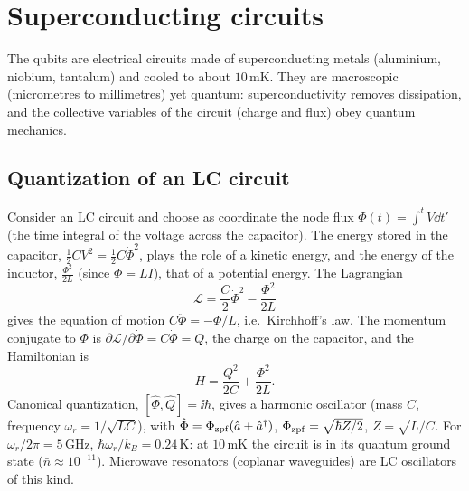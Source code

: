 \section{Superconducting circuits}\label{sec:transmon}
The qubits are electrical circuits made of superconducting metals (aluminium, niobium, tantalum) and cooled to about $10$\,mK. They are macroscopic (micrometres to millimetres) yet quantum: superconductivity removes dissipation, and the
collective variables of the circuit (charge and flux) obey quantum mechanics.

\subsection{Quantization of an LC circuit}\label{sec:lc}
\begin{origin}
Consider an LC circuit and choose as coordinate the node flux $\Phi(t)=\int^tV\dd t'$ (the time integral of the voltage across the capacitor). The energy stored in the capacitor, $\frac12CV^2=\frac12C\dot\Phi^2$, plays the role of a kinetic
energy, and the energy of the inductor, $\frac{\Phi^2}{2L}$ (since $\Phi=LI$), that of a potential energy. The Lagrangian
\begin{equation}
  \mathcal L=\frac C2\dot\Phi^2-\frac{\Phi^2}{2L}
\end{equation}
gives the equation of motion $C\ddot\Phi=-\Phi/L$, i.e.\ Kirchhoff's law. The momentum conjugate to $\Phi$ is $\partial\mathcal L/\partial\dot\Phi=C\dot\Phi=Q$, the charge on the capacitor, and the Hamiltonian is
\begin{equation}
  H=\frac{Q^2}{2C}+\frac{\Phi^2}{2L}.
\end{equation}
Canonical quantization, $[\hat\Phi,\hat Q]=\ii\hbar$, gives a harmonic oscillator (mass $C$, frequency $\omega_r=1/\sqrt{LC}$), with $\hat\Phi=\Phi_{\rm zpf}(\hat a+\hat a^\dagger)$, $\Phi_{\rm zpf}=\sqrt{\hbar Z/2}$, $Z=\sqrt{L/C}$. For
$\omega_r/2\pi=5$\,GHz, $\hbar\omega_r/k_B=0.24$\,K: at $10$\,mK the circuit is in its quantum ground state ($\bar n\approx10^{-11}$). Microwave resonators (coplanar waveguides) are LC oscillators of this kind.
\end{origin}

